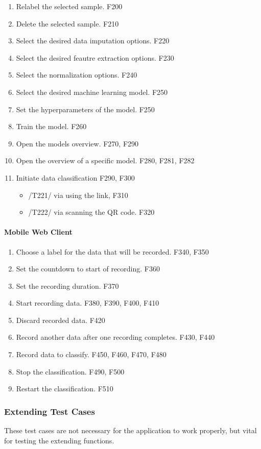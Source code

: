 \begin{enumerate}[{label = \textbf{/T{\protect\twodigits{\arabic{enumi}}}0/}, leftmargin = *}]
    \item Relabel the selected sample. F200
    \item Delete the selected sample. F210
    \item Select the desired data imputation options. F220
    \item Select the desired feautre extraction options. F230
    \item Select the normalization options. F240
    \item Select the desired machine learning model. F250
    \item Set the hyperparameters of the model. F250
    \item Train the model. F260
    \item Open the models overview. F270, F290
    \item Open the overview of a specific model. F280, F281, F282
    \item Initiate data classification F290, F300
    \begin{itemize}
        \item /T221/ via using the link, F310
        \item /T222/ via scanning the QR code. F320
    \end{itemize} 
\end{enumerate}

\paragraph{Mobile Web Client}
\begin{enumerate}[resume*]
    \item Choose a label for the data that will be recorded. F340, F350
    \item Set the countdown to start of recording. F360
    \item Set the recording duration. F370
    \item Start recording data. F380, F390, F400, F410
    \item Discard recorded data. F420
    \item Record another data after one recording completes. F430, F440
    \item Record data to classify. F450, F460, F470, F480
    \item Stop the classification. F490, F500
    \item Restart the classification. F510
\end{enumerate}

\subsubsection{Extending Test Cases}
These test cases are not necessary for the application to work properly, but vital for testing the extending functions. 
